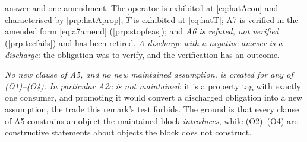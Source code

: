 \begin{remark}
\begin{enumerate}
{answer and one amendment.} The operator is
exhibited at \eqref{eq:hatAcon} and characterised by \cref{prp:hatAprop}; $\hat T$ is exhibited at
\eqref{eq:hatT}; A7 is verified in the amended form \eqref{eq:a7amend}
(\cref{prp:stopfeas}); and \emph{A6 is refuted, not verified} (\cref{prp:tccfails}) and has been
retired. \emph{A discharge with a negative answer is a discharge}: the obligation was to verify, and
the verification has an outcome.
\end{enumerate}

\emph{No new clause of A5, and no new maintained
assumption, is created for any of (O1)--(O4). In particular A2c is not maintained}: it is a
property tag with exactly one consumer, and promoting it would convert a discharged
obligation into a new assumption, the trade this remark's test forbids. The ground is
that every clause of A5 constrains an object the maintained block \emph{introduces}, while (O2)--(O4) are
constructive statements about objects the block does not construct.
\end{remark}

